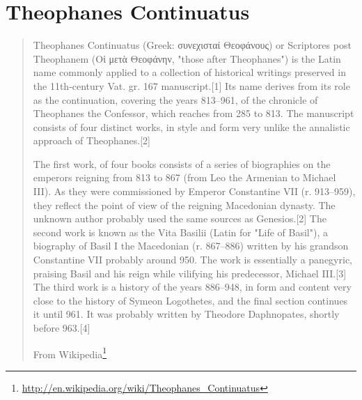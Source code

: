\documentclass[12pt,letterpaper,twoside,final]{memoir}
\begin{document}
\section{Theophanes Continuatus}
\blockquote[From Wikipedia\footnote{\url{http://en.wikipedia.org/wiki/Theophanes_Continuatus}}]{Theophanes Continuatus (Greek: συνεχισταί Θεοφάνους) or Scriptores post Theophanem (Οἱ μετὰ Θεοφάνην, "those after Theophanes") is the Latin name commonly applied to a collection of historical writings preserved in the 11th-century Vat. gr. 167 manuscript.[1] Its name derives from its role as the continuation, covering the years 813–961, of the chronicle of Theophanes the Confessor, which reaches from 285 to 813. The manuscript consists of four distinct works, in style and form very unlike the annalistic approach of Theophanes.[2]

The first work, of four books consists of a series of biographies on the emperors reigning from 813 to 867 (from Leo the Armenian to Michael III). As they were commissioned by Emperor Constantine VII (r. 913–959), they reflect the point of view of the reigning Macedonian dynasty. The unknown author probably used the same sources as Genesios.[2] The second work is known as the Vita Basilii (Latin for "Life of Basil"), a biography of Basil I the Macedonian (r. 867–886) written by his grandson Constantine VII probably around 950. The work is essentially a panegyric, praising Basil and his reign while vilifying his predecessor, Michael III.[3] The third work is a history of the years 886–948, in form and content very close to the history of Symeon Logothetes, and the final section continues it until 961. It was probably written by Theodore Daphnopates, shortly before 963.[4]}
\end{document}
